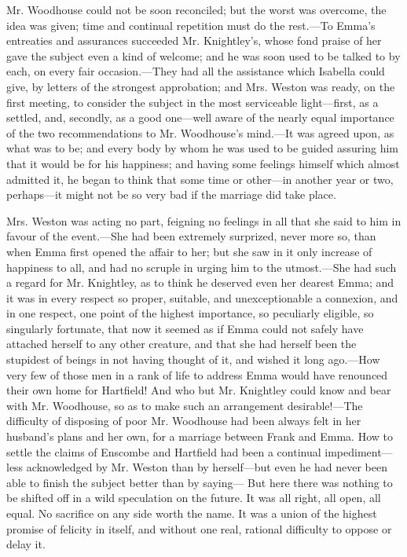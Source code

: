 Mr. Woodhouse could not be soon reconciled; but the worst was overcome, the idea was given; time and continual repetition must do the rest.---To Emma's entreaties and assurances succeeded Mr. Knightley's, whose fond praise of her gave the subject even a kind of welcome; and he was soon used to be talked to by each, on every fair occasion.---They had all the assistance which Isabella could give, by letters of the strongest approbation; and Mrs. Weston was ready, on the first meeting, to consider the subject in the most serviceable light---first, as a settled, and, secondly, as a good one---well aware of the nearly equal importance of the two recommendations to Mr. Woodhouse's mind.---It was agreed upon, as what was to be; and every body by whom he was used to be guided assuring him that it would be for his happiness; and having some feelings himself which almost admitted it, he began to think that some time or other---in another year or two, perhaps---it might not be so very bad if the marriage did take place.

Mrs. Weston was acting no part, feigning no feelings in all that she said to him in favour of the event.---She had been extremely surprized, never more so, than when Emma first opened the affair to her; but she saw in it only increase of happiness to all, and had no scruple in urging him to the utmost.---She had such a regard for Mr. Knightley, as to think he deserved even her dearest Emma; and it was in every respect so proper, suitable, and unexceptionable a connexion, and in one respect, one point of the highest importance, so peculiarly eligible, so singularly fortunate, that now it seemed as if Emma could not safely have attached herself to any other creature, and that she had herself been the stupidest of beings in not having thought of it, and wished it long ago.---How very few of those men in a rank of life to address Emma would have renounced their own home for Hartfield! And who but Mr. Knightley could know and bear with Mr. Woodhouse, so as to make such an arrangement desirable!---The difficulty of disposing of poor Mr. Woodhouse had been always felt in her husband's plans and her own, for a marriage between Frank and Emma. How to settle the claims of Enscombe and Hartfield had been a continual impediment---less acknowledged by Mr. Weston than by herself---but even he had never been able to finish the subject better than by saying--- But here there was nothing to be shifted off in a wild speculation on the future. It was all right, all open, all equal. No sacrifice on any side worth the name. It was a union of the highest promise of felicity in itself, and without one real, rational difficulty to oppose or delay it.

